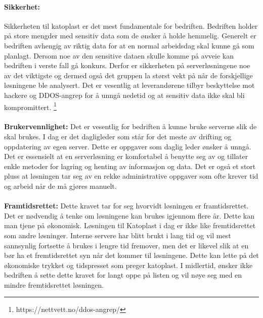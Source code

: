 \paragraph{Sikkerhet:} \hspace{-0.95em} Sikkerheten til katoplast er det mest fundamentale for bedriften. Bedriften holder på store mengder med sensitiv data som de ønsker å holde hemmelig. Generelt er bedriften avhengig av riktig data for at en normal arbeidsdag skal kunne gå som planlagt. Dersom noe av den sensitive dataen skulle komme på avveie kan bedriften i verste fall gå konkurs. Derfor er sikkerheten på serverløsningene noe av det viktigste og dermed også det gruppen la størst vekt på når de forskjellige løsningene ble analysert. Det er vesentlig at leverandørene tilbyr beskyttelse mot hackere og DDOS-angrep for å unngå nedetid og at sensitiv data ikke skal bli kompromittert. 
\footnote{https://nettvett.no/ddos-angrep/}

\paragraph{}{\bfseries Brukervennlighet:} \hspace{-0.95em}  Det er vesentlig for bedriften å kunne bruke serverne slik de skal brukes. I dag er det dagligleder som står for det meste av drifting og oppdatering av egen server. Dette er oppgaver som daglig leder ønsker å unngå. Det er essensielt at en serverløsning er komfortabel å benytte seg av og tillater enkle metoder for lagring og henting av informasjon og data. Det er også et stort pluss at løsningen tar seg av en rekke administrative oppgaver som ofte krever tid og arbeid når de må gjøres manuelt.  


\paragraph{}{\bfseries Framtidsrettet:} \hspace{-0.95em} Dette kravet tar for seg hvorvidt løsningen er framtidsrettet. Det er nødvendig å tenke om løsningene kan brukes igjennom flere år. Dette kan man tjene på økonomisk. Løsningen til Katoplast i dag er ikke like fremtidsrettet som andre løsninger. Interne servere har blitt brukt i lang tid og vil mest sannsynlig fortsette å brukes i lengre tid fremover, men det er likevel slik at en bør ha et fremtidsrettet syn når det kommer til løsningene. Dette kan lette på det økonomiske trykket og tidspresset som preger katoplast. I midlertid, ønsker ikke bedriften å sette dette kravet for langt oppe på listen og vil nøye seg med en mindre fremtidsrettet løsningen.

